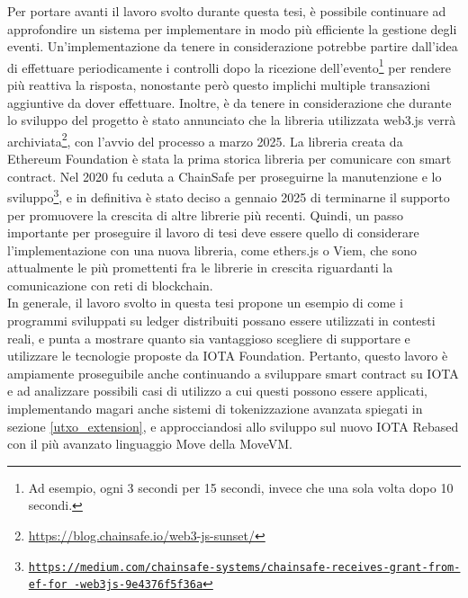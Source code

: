 \documentclass[12pt,a4paper,openright,twoside]{report}
\renewcommand{\chaptermark}[1]{\markboth{\thechapter.\ #1}{}}
\begin{document}
Per portare avanti il lavoro svolto durante questa tesi, è possibile continuare ad approfondire un sistema per implementare in modo più efficiente la gestione degli eventi. Un'implementazione da tenere in considerazione potrebbe partire dall'idea di effettuare periodicamente i controlli dopo la ricezione dell'evento\footnote{Ad esempio, ogni 3 secondi per 15 secondi, invece che una sola volta dopo 10 secondi.} per rendere più reattiva la risposta, nonostante però questo implichi multiple transazioni aggiuntive da dover effettuare. Inoltre, è da tenere in considerazione che durante lo sviluppo del progetto è stato annunciato che la libreria utilizzata web3.js verrà archiviata\footnote{\url{https://blog.chainsafe.io/web3-js-sunset/}}, con l'avvio del processo a marzo 2025. La libreria creata da Ethereum Foundation è stata la prima storica libreria per comunicare con smart contract. Nel 2020 fu ceduta a ChainSafe per proseguirne la manutenzione e lo sviluppo\footnote{\href{https://medium.com/chainsafe-systems/chainsafe-receives-grant-from-ef-for-web3js-9e4376f5f36a}{\texttt{https://medium.com/chainsafe-systems/chainsafe-receives-grant-from-ef-for -web3js-9e4376f5f36a}}}, e in definitiva è stato deciso a gennaio 2025 di terminarne il supporto per promuovere la crescita di altre librerie più recenti. Quindi, un passo importante per proseguire il lavoro di tesi deve essere quello di considerare l'implementazione con una nuova libreria, come ethers.js o Viem, che sono attualmente le più promettenti fra le librerie in crescita riguardanti la comunicazione con reti di blockchain.\\
In generale, il lavoro svolto in questa tesi propone un esempio di come i programmi sviluppati su ledger distribuiti possano essere utilizzati in contesti reali, e punta a mostrare quanto sia vantaggioso scegliere di supportare e utilizzare le tecnologie proposte da IOTA Foundation. Pertanto, questo lavoro è ampiamente proseguibile anche continuando a sviluppare smart contract su IOTA e ad analizzare possibili casi di utilizzo a cui questi possono essere applicati, implementando magari anche sistemi di tokenizzazione avanzata spiegati in sezione \ref{utxo_extension}, e approcciandosi allo sviluppo sul nuovo IOTA Rebased con il più avanzato linguaggio Move della MoveVM.\

\clearpage{\pagestyle{empty}\cleardoublepage}



\renewcommand{\chaptermark}[1]{\markright{\thechapter \ #1}{}}
\lhead[\fancyplain{}{\bfseries\thepage}]{\fancyplain{}{\bfseries\rightmark}}
\appendix %
\end{document}
